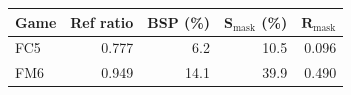 \begin{tabular}{@{}lrrrr@{}}
\toprule
\textbf{Game} & \textbf{Ref ratio} & \textbf{BSP} (\%) & $\mathbf{S_{\mathrm{mask}}}$ (\%) & $\mathbf{R_{\mathrm{mask}}}$ \\
\midrule
FC5 & 0.777 & 6.2 & 10.5 & 0.096 \\
FM6 & 0.949 & 14.1 & 39.9 & 0.490 \\
\bottomrule
\end{tabular}

